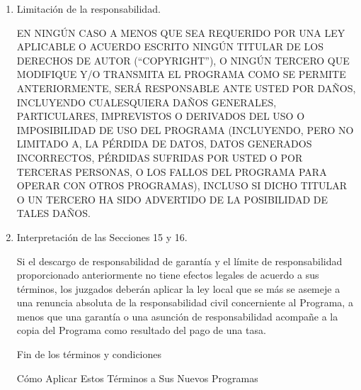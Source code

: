 \documentclass[11pt]{article}
\begin{document}
\begin{enumerate}
\begin{sloppypar}
 NO HAY GARANT\'{I}A PARA EL PROGRAMA, PARA LA EXTENSI\'{O}N PERMITIDA POR LA LEY 
APLICABLE. EXCEPTO CUANDO SE INDIQUE LO CONTRARIO POR ESCRITO, LOS TITULARES 
DE LOS DERECHOS DE AUTOR (``COPYRIGHT'') Y/O TERCEROS PROPORCIONAN EL PROGRAMA 
``TAL CUAL'' SIN GARANT\'{I}AS DE NING\'{U}N TIPO, BIEN SEAN EXPL\'{I}CITAS O IMPL\'{I}CITAS, 
INCLUYENDO, PERO NO LIMITADO A, LAS GARANT\'{I}AS IMPL\'{I}CITAS DE COMERCIALIZACI\'{O}N 
Y APTITUD PARA UN PROP\'{O}SITO PARTICULAR. EL RIESGO TOTAL EN CUANTO A CALIDAD 
Y RENDIMIENTO DEL PROGRAMA ES CON USTED. SI EL PROGRAMA PRESENTA ALG\'{U}N 
DEFECTO, USTED ASUME EL COSTO DE TODOS LAS REVISIONES NECESARIAS, 
REPARACIONES O CORRECCIONES.
\end{sloppypar}

\item Limitaci\'{o}n de la responsabilidad.

 EN NING\'{U}N CASO A MENOS QUE SEA REQUERIDO POR UNA LEY APLICABLE O ACUERDO ESCRITO NING\'{U}N TITULAR DE LOS DERECHOS DE AUTOR
(``COPYRIGHT''), O NING\'{U}N TERCERO QUE MODIFIQUE Y/O TRANSMITA EL PROGRAMA COMO SE PERMITE ANTERIORMENTE, SER\'{A} RESPONSABLE ANTE USTED POR DA\~NOS, INCLUYENDO CUALESQUIERA DA\~NOS GENERALES, PARTICULARES, IMPREVISTOS O DERIVADOS DEL USO O IMPOSIBILIDAD DE USO DEL PROGRAMA
 (INCLUYENDO, PERO NO LIMITADO A, LA P\'{E}RDIDA DE DATOS, DATOS GENERADOS INCORRECTOS, P\'{E}RDIDAS SUFRIDAS POR USTED O POR TERCERAS PERSONAS, O LOS FALLOS DEL PROGRAMA PARA OPERAR CON OTROS PROGRAMAS), INCLUSO SI DICHO TITULAR O UN TERCERO HA SIDO ADVERTIDO DE LA POSIBILIDAD DE TALES DA\~NOS.

\item Interpretaci\'{o}n de las Secciones 15 y 16.

Si el descargo de responsabilidad de garant\'{i}a y el l\'{i}mite de responsabilidad 
proporcionado anteriormente no tiene efectos legales de acuerdo a sus t\'{e}rminos, los juzgados deber\'{a}n aplicar la ley local que se m\'{a}s se asemeje a una 
renuncia absoluta de la responsabilidad civil concerniente al Programa, a 
menos que una garant\'{i}a o una asunci\'{o}n de responsabilidad acompa\~ne a la copia 
del Programa como resultado del pago de una tasa.

\begin{center}
{\Large\sc Fin de los t\'{e}rminos y condiciones}

\bigskip
C\'{o}mo Aplicar Estos T\'{e}rminos a Sus Nuevos Programas
\end{center}


\end{enumerate}
\end{document}

